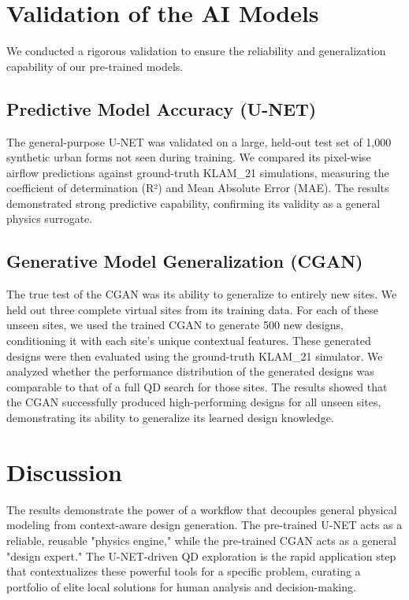 \documentclass[times,final]{elsarticle}
\begin{document}
\section{Validation of the AI Models}
We conducted a rigorous validation to ensure the reliability and generalization capability of our pre-trained models.

\subsection{Predictive Model Accuracy (U-NET)}
The general-purpose U-NET was validated on a large, held-out test set of 1,000 synthetic urban forms not seen during training. We compared its pixel-wise airflow predictions against ground-truth KLAM\_21 simulations, measuring the coefficient of determination (R²) and Mean Absolute Error (MAE). The results demonstrated strong predictive capability, confirming its validity as a general physics surrogate.

\subsection{Generative Model Generalization (CGAN)}
The true test of the CGAN was its ability to generalize to entirely new sites. We held out three complete virtual sites from its training data. For each of these unseen sites, we used the trained CGAN to generate 500 new designs, conditioning it with each site's unique contextual features. These generated designs were then evaluated using the ground-truth KLAM\_21 simulator. We analyzed whether the performance distribution of the generated designs was comparable to that of a full QD search for those sites. The results showed that the CGAN successfully produced high-performing designs for all unseen sites, demonstrating its ability to generalize its learned design knowledge.

\section{Discussion}
The results demonstrate the power of a workflow that decouples general physical modeling from context-aware design generation. The pre-trained U-NET acts as a reliable, reusable "physics engine," while the pre-trained CGAN acts as a general "design expert." The U-NET-driven QD exploration is the rapid application step that contextualizes these powerful tools for a specific problem, curating a portfolio of elite local solutions for human analysis and decision-making.
\end{document}
